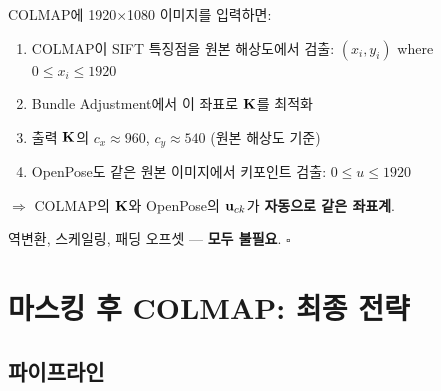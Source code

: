 \documentclass[11pt, a4paper]{report}
\theoremstyle{definition}
\theoremstyle{remark}
\begin{document}
\begin{proofbox}[title={COLMAP의 좌표계 일관성}]
COLMAP에 1920$\times$1080 이미지를 입력하면:

\begin{enumerate}[nosep]
  \item COLMAP이 SIFT 특징점을 원본 해상도에서 검출: $(x_i, y_i)$ where $0 \leq x_i \leq 1920$
  \item Bundle Adjustment에서 이 좌표로 $\mathbf{K}$를 최적화
  \item 출력 $\mathbf{K}$의 $c_x \approx 960$, $c_y \approx 540$ (원본 해상도 기준)
  \item OpenPose도 같은 원본 이미지에서 키포인트 검출: $0 \leq u \leq 1920$
\end{enumerate}

$\Rightarrow$ COLMAP의 $\mathbf{K}$와 OpenPose의 $\mathbf{u}_{ck}$가 \textbf{자동으로 같은 좌표계}.

역변환, 스케일링, 패딩 오프셋 --- \textbf{모두 불필요}. $\square$
\end{proofbox}


\chapter{마스킹 후 COLMAP: 최종 전략}

\section{파이프라인}
\end{document}
